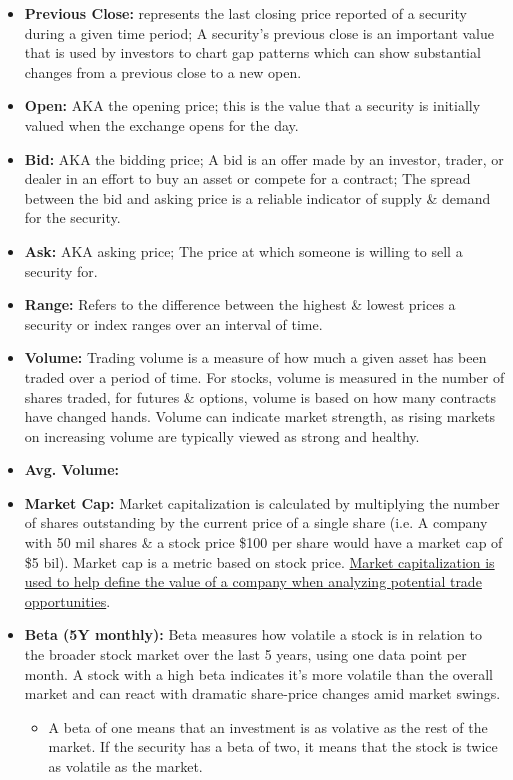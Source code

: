 \documentclass{article}
\begin{document}
	\begin{itemize}
		\item {\bf Previous Close:} represents the last closing price reported of a security during a given time period; A security's previous close is an important value that is used by investors to chart gap patterns which can show substantial changes from a previous close to a new open.
		\item {\bf Open:} AKA the opening price; this is the value that a security is initially valued when the exchange opens for the day.
		\item {\bf Bid:} AKA the bidding price; A bid is an offer made by an investor, trader, or dealer in an effort to buy an asset or compete for a contract; The spread between the bid and asking price is a reliable indicator of supply \& demand for the security.
		\item {\bf Ask:} AKA asking price; The price at which someone is willing to sell a security for.
		\item {\bf Range:} Refers to the difference between the highest \& lowest prices a security or index ranges over an interval of time.
		\item {\bf Volume:} Trading volume is a measure of how much a given asset has been traded over a period of time. For stocks, volume is measured in the number of shares traded, for futures \& options, volume is based on how many contracts have changed hands. Volume can indicate market strength, as rising markets on increasing volume are typically viewed as strong and healthy.
		\item {\bf Avg. Volume:}
		\item {\bf Market Cap:} Market capitalization is calculated by multiplying the number of shares outstanding by the current price of a single share (i.e. A company with 50 mil shares \& a stock price \$100 per share would have a market cap of \$5 bil). Market cap is a metric based on stock price. \underline{Market capitalization is used to help define the value of a company when analyzing potential trade opportunities}. 
		\item {\bf Beta (5Y monthly):} Beta measures how volatile a stock is in relation to the broader stock market over the last 5 years, using one data point per month. A stock with a high beta indicates it's more volatile than the overall market and can react with dramatic share-price changes amid market swings. 
			\begin{itemize}
				\item A beta of one means that an investment is as volative as the rest of the market. If the security has a beta of two, it means that the stock is twice as volatile as the market. 

\end{itemize}
\end{itemize}
\end{document}
